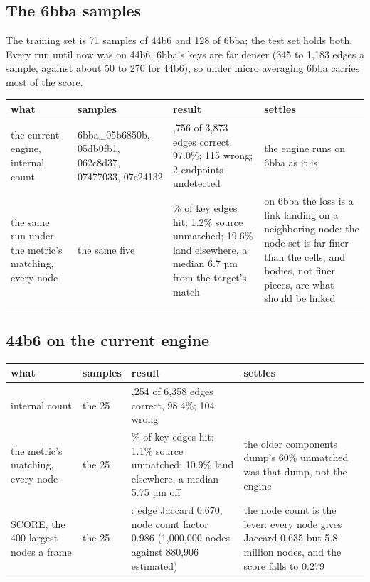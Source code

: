 \subsection{\texorpdfstring{The 6bba samples}{The 6bba samples}}

The training set is 71 samples of 44b6 and 128 of 6bba; the test set holds both. Every run until now was on 44b6. 6bba's keys are far denser (345 to 1,183 edges a sample, against about 50 to 270 for 44b6), so under micro averaging 6bba carries most of the score.

{\footnotesize
\setlength{\tabcolsep}{6pt}
\begin{longtable}{>{\RaggedRight\arraybackslash}p{}>{\RaggedRight\arraybackslash}p{}>{\RaggedRight\arraybackslash}p{}>{\RaggedRight\arraybackslash}p{}}
\toprule
what & samples & result & settles \\
\midrule
\endhead
the current engine, internal count & 6bba\_\allowbreak{}05b6850b, 05db0fb1, 062c8d37, 07477033, 07e24132 & 3,756 of 3,873 edges correct, 97.0\%; 115 wrong; 2 endpoints undetected & the engine runs on 6bba as it is \\
the same run under the metric's matching, every node & the same five & 78.5\% of key edges hit; 1.2\% source unmatched; 19.6\% land elsewhere, a median 6.7 µm from the target's match & on 6bba the loss is a link landing on a neighboring node: the node set is far finer than the cells, and bodies, not finer pieces, are what should be linked \\
\bottomrule
\end{longtable}
}

\subsection{\texorpdfstring{44b6 on the current engine}{44b6 on the current engine}}

{\footnotesize
\setlength{\tabcolsep}{6pt}
\begin{longtable}{>{\RaggedRight\arraybackslash}p{}>{\RaggedRight\arraybackslash}p{}>{\RaggedRight\arraybackslash}p{}>{\RaggedRight\arraybackslash}p{}}
\toprule
what & samples & result & settles \\
\midrule
\endhead
internal count & the 25 & 6,254 of 6,358 edges correct, 98.4\%; 104 wrong &  \\
the metric's matching, every node & the 25 & 87.1\% of key edges hit; 1.1\% source unmatched; 10.9\% land elsewhere, a median 5.75 µm off & the older components dump's 60\% unmatched was that dump, not the engine \\
SCORE, the 400 largest nodes a frame & the 25 & 0.661: edge Jaccard 0.670, node count factor 0.986 (1,000,000 nodes against 880,906 estimated) & the node count is the lever: every node gives Jaccard 0.635 but 5.8 million nodes, and the score falls to 0.279 \\
\bottomrule
\end{longtable}
}
